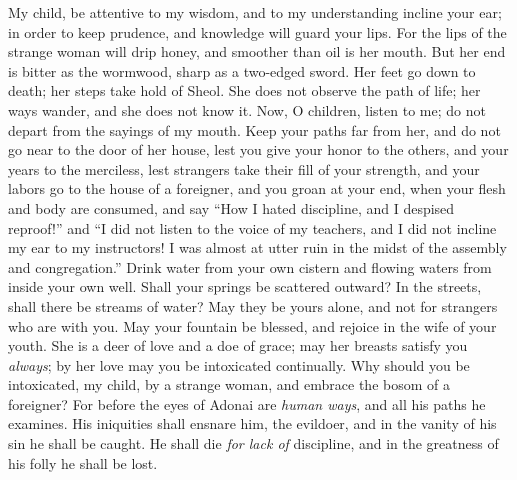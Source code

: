 \begin{biblechapter} %
\verse My child, be attentive to my wisdom, 
and to my understanding incline your ear;
\verse in order to keep prudence, 
and knowledge will guard your lips.
\verse For the lips of the strange woman will drip honey, 
and smoother than oil is her mouth.
\verse But her end is bitter as the wormwood, 
sharp as a two-edged sword.
\verse Her feet go down to death; 
her steps take hold of Sheol.
\verse She does not observe the path of life; 
her ways wander, and she does not know it.
 Now, O children, listen to me; 
do not depart from the sayings of my mouth.
\verse Keep your paths far from her, 
and do not go near to the door of her house,
\verse lest you give your honor to the others, 
and your years to the merciless,
\verse lest strangers take their fill of your strength, 
and your labors go to the house of a foreigner,
\verse and you groan at your end, 
when your flesh and body are consumed,
\verse and say “How I hated discipline, 
and I despised reproof!”
\verse and “I did not listen to the voice of my teachers, 
and I did not incline my ear to my instructors!
\verse I was almost at utter ruin 
in the midst of the assembly and congregation.”
\verse Drink water from your own cistern 
and flowing waters from inside your own well.
\verse Shall your springs be scattered outward? 
In the streets, shall there be streams of water?
\verse May they be yours alone, 
and not for strangers who are with you.
\verse May your fountain be blessed, 
and rejoice in the wife of your youth.
\verse She is a deer of love and a doe of grace; 
may her breasts satisfy you \textit{always}; 
by her love may you be intoxicated continually.
\verse Why should you be intoxicated, my child, by a strange woman, 
and embrace the bosom of a foreigner?
\verse For before the eyes of Adonai are \textit{human ways}, 
and all his paths he examines.
\verse His iniquities shall ensnare him, the evildoer, 
and in the vanity of his sin he shall be caught.
\verse He shall die \textit{for lack of} discipline, 
and in the greatness of his folly he shall be lost.
\end{biblechapter}

